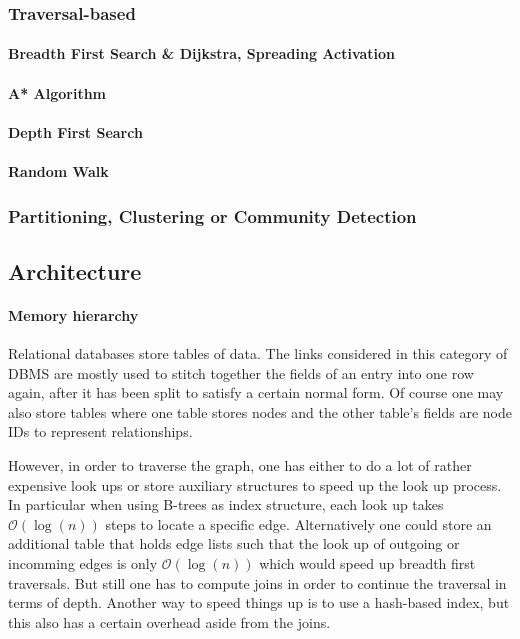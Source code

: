         \subsubsection{Traversal-based}
            \paragraph{Breadth First Search \& Dijkstra, Spreading Activation}
            \paragraph{A* Algorithm}
            \paragraph{Depth First Search}
            \paragraph{Random Walk}
        
        \subsubsection{Partitioning, Clustering or Community Detection}
            
            
    \subsection{Architecture}\label{\positionnumber}
            \paragraph{Memory hierarchy}
        Relational databases store tables of data.
        The links considered in this category of DBMS are mostly used to stitch together the fields of an entry into one row again, after it has been split to satisfy a certain normal form.
        Of course one may also store tables where one table stores nodes and the other table's fields are node IDs to represent relationships.

        However, in order to traverse the graph, one has either to do a lot of rather expensive look ups or store auxiliary structures to speed up the look up process.
        In particular when using B-trees as index structure, each look up takes $\mathcal{O}(\log(n))$ steps to locate a specific edge.
        Alternatively one could store an additional table that holds edge lists such that the look up of outgoing or incomming edges is only $\mathcal{O}(\log(n))$ which would speed up breadth first traversals.
        But still one has to compute joins in order to continue the traversal in terms of depth.
        Another way to speed things up is to use a hash-based index, but this also has a certain overhead aside from the joins.

